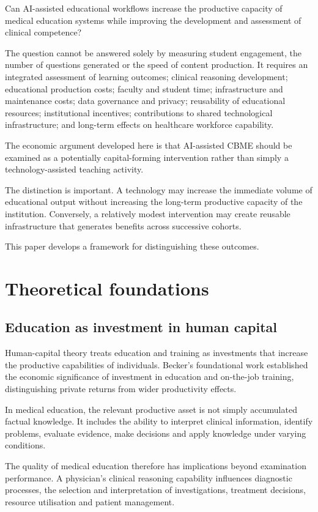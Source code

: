 \documentclass[11pt,a4paper]{article}
\begin{document}
Can AI-assisted educational workflows increase the productive capacity of medical education systems while improving the development and assessment of clinical competence?

The question cannot be answered solely by measuring student engagement, the number of questions generated or the speed of content production. It requires an integrated assessment of learning outcomes; clinical reasoning development; educational production costs; faculty and student time; infrastructure and maintenance costs; data governance and privacy; reusability of educational resources; institutional incentives; contributions to shared technological infrastructure; and long-term effects on healthcare workforce capability.

The economic argument developed here is that AI-assisted CBME should be examined as a potentially capital-forming intervention rather than simply a technology-assisted teaching activity.

The distinction is important. A technology may increase the immediate volume of educational output without increasing the long-term productive capacity of the institution. Conversely, a relatively modest intervention may create reusable infrastructure that generates benefits across successive cohorts.

This paper develops a framework for distinguishing these outcomes.

\section{Theoretical foundations}
\subsection{Education as investment in human capital}
Human-capital theory treats education and training as investments that increase the productive capabilities of individuals. Becker's foundational work established the economic significance of investment in education and on-the-job training, distinguishing private returns from wider productivity effects.

In medical education, the relevant productive asset is not simply accumulated factual knowledge. It includes the ability to interpret clinical information, identify problems, evaluate evidence, make decisions and apply knowledge under varying conditions.

The quality of medical education therefore has implications beyond examination performance. A physician's clinical reasoning capability influences diagnostic processes, the selection and interpretation of investigations, treatment decisions, resource utilisation and patient management.
\end{document}
